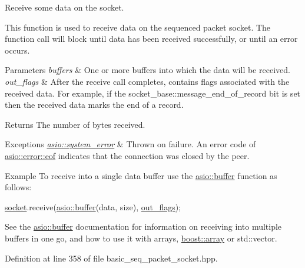 Receive some data on the socket. 

This function is used to receive data on the sequenced packet socket. The function call will block until data has been received successfully, or until an error occurs.


\begin{DoxyParams}{Parameters}
{\em buffers} & One or more buffers into which the data will be received.\\
\hline
{\em out\+\_\+flags} & After the receive call completes, contains flags associated with the received data. For example, if the socket\+\_\+base\+::message\+\_\+end\+\_\+of\+\_\+record bit is set then the received data marks the end of a record.\\
\hline
\end{DoxyParams}
\begin{DoxyReturn}{Returns}
The number of bytes received.
\end{DoxyReturn}

\begin{DoxyExceptions}{Exceptions}
{\em \hyperlink{classasio_1_1system__error}{asio\+::system\+\_\+error}} & Thrown on failure. An error code of \hyperlink{namespaceasio_1_1error_ade61a402d1dfb10b1c223906f5ea7847abb0b3b47deff67dd67b180d9d1e34154}{asio\+::error\+::eof} indicates that the connection was closed by the peer.\\
\hline
\end{DoxyExceptions}
\begin{DoxyParagraph}{Example}
To receive into a single data buffer use the \hyperlink{group__buffer}{asio\+::buffer} function as follows\+: 
\begin{DoxyCode}
\hyperlink{namespacewebsocketpp_1_1transport_1_1asio_1_1socket_1_1error_a828ddaa5ed63a761e1b557465a35f05aa0c31b356014843e1d09514e794a539a7}{socket}.receive(\hyperlink{group__buffer_ga1ed66e401559cbfd19595392f653b47c}{asio::buffer}(data, size), \hyperlink{classasio_1_1basic__seq__packet__socket_a8e5185dc6014d8e5f9e91ab7743ace7c}{out\_flags});
\end{DoxyCode}
 See the \hyperlink{group__buffer}{asio\+::buffer} documentation for information on receiving into multiple buffers in one go, and how to use it with arrays, \hyperlink{classboost_1_1array}{boost\+::array} or std\+::vector. 
\end{DoxyParagraph}


Definition at line 358 of file basic\+\_\+seq\+\_\+packet\+\_\+socket.\+hpp.

\hypertarget{classasio_1_1basic__seq__packet__socket_a62583bc09ddc7e60b195b6cd77704939}{}
